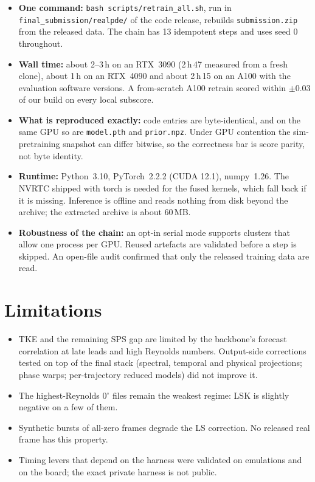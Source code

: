 \documentclass[10pt]{article}
\newcommand{\cfg}[1]{\texttt{#1}}
\begin{document}
\begin{itemize}
\item \textbf{One command:} \cfg{bash scripts/retrain\_all.sh}, run in \cfg{final\_submission/realpde/} of the
  code release, rebuilds \cfg{submission.zip} from the released
  data. The chain has 13 idempotent steps and uses seed 0 throughout.
\item \textbf{Wall time:} about 2--3\,h on an RTX~3090 (2\,h\,47 measured from a fresh clone), about 1\,h on an RTX~4090 and about 2\,h\,15 on an A100 with the evaluation software
  versions. A from-scratch A100 retrain scored within $\pm0.03$ of our build on every local subscore.
\item \textbf{What is reproduced exactly:} code entries are byte-identical, and on the same GPU so are
  \cfg{model.pth} and \cfg{prior.npz}. Under GPU contention the sim-pretraining snapshot can differ bitwise, so
  the correctness bar is score parity, not byte identity.
\item \textbf{Runtime:} Python~3.10, PyTorch~2.2.2 (CUDA 12.1), numpy~1.26. The NVRTC shipped with torch is
  needed for the fused kernels, which fall back if it is missing. Inference is offline and reads nothing from disk
  beyond the archive; the extracted archive is about 60\,MB.
\item \textbf{Robustness of the chain:} an opt-in serial mode supports clusters that allow one process per GPU.
  Reused artefacts are validated before a step is skipped. An open-file audit confirmed that only the released
  training data are read.
\end{itemize}

\section{Limitations}
\begin{itemize}
\item TKE and the remaining SPS gap are limited by the backbone's forecast correlation at late leads and high
  Reynolds numbers. Output-side corrections tested on top of the final stack (spectral, temporal and physical
  projections; phase warps; per-trajectory reduced models) did not improve it.
\item The highest-Reynolds 0$^\circ$ files remain the weakest regime: LSK is slightly negative on a few of
  them.
\item Synthetic bursts of all-zero frames degrade the LS correction. No released real frame has this property.
\item Timing levers that depend on the harness were validated on emulations and on the board; the exact private
  harness is not public.
\end{itemize}
\end{document}
